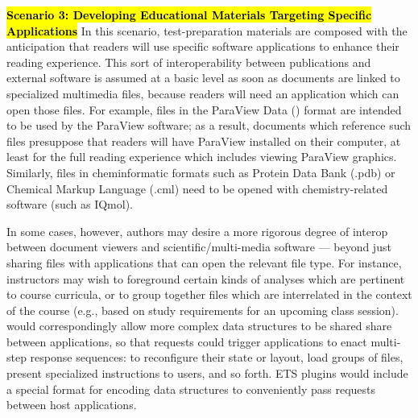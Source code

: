 \documentclass[10pt,letterpaper]{article}
\newcommand{\sectsp}{\vspace{12pt}}
\newcommand{\pseudoIndent}{

\vspace{10pt}\hspace*{12pt}}
\newcommand{\HTXN}{\resizebox{!}{8pt}{\AcronymText{HTXN}}}
\newcommand{\PVD}{\resizebox{!}{8pt}{\AcronymText{PVD}}}
\newcommand{\lEPF}{\resizebox{!}{8.5pt}{\AcronymText{ETS{\color{pfcolor}pf}}}}
\newcommand{\textscc}[1]{{\color{orr!35!black}{{%
						\fontfamily{Cabin-TLF}\fontseries{b}\selectfont{\textsc{\scriptsize{#1}}}}}}}
\newcommand{\AcronymText}[1]{{\textscc{#1}}}
\newcommand{\p}[1]{

\vspace{.85em}#1}
\newcommand{\lun}[1]{\raisebox{-4pt}{\fontfamily{qcr}\selectfont{%
\LARGE{\textbf{\textcolor{tcolor}{#1}}}}}\vspace{-2pt}}
\newenvironment{mldescription}{\vspace{1em}%
  \begin{addmargin}[4pt]{1em}
    \setlength{\parindent}{-1em}%
    \newcommand*{\mlitem}[1][]{\vspace{5pt}\par\medskip%
\hl{ \textbf{##1} }\quad}\indent
}{%
  \end{addmargin}
  \medskip
}
\begin{document}
{{\begin{mldescription}

\vspace{2em}
\mlitem[Scenario 3: Developing Educational 
Materials Targeting Specific Applications]
In this scenario, test-preparation 
materials are composed with the anticipation 
that readers will use specific software applications to 
enhance their reading experience.  This sort 
of interoperability between publications and external 
software is assumed at a basic level 
as soon as documents are linked to specialized 
multimedia files, because readers will need an 
application which can open those files.  For example, files in the 
ParaView Data (\PVD{}) format are intended to be 
used by the ParaView software; as a result, documents 
which reference such files presuppose that readers 
will have ParaView installed on their computer, at least for 
the full reading experience which includes viewing ParaView graphics.  Similarly, files 
in cheminformatic formats such as Protein Data Bank 
(.pdb) or Chemical Markup Language (.cml) need to 
be opened with chemistry-related software (such as  IQmol).

\pseudoIndent{}In some cases, however, authors may 
desire a more rigorous degree of interop between 
document viewers and scientific/multi-media software --- beyond just sharing files 
with applications that can open 
the relevant file type.  For instance, 
instructors may wish to foreground 
certain kinds of analyses which are pertinent to 
course curricula, or to group together files which 
are interrelated in the context of the course 
(e.g., based on study requirements for an upcoming 
class session).  \lEPF{} would correspondingly 
allow more complex data structures to be 
shared share between applications, so 
that requests could trigger applications 
to enact multi-step response sequences: to  reconfigure their state or layout, 
load groups of files, present specialized instructions to users, and so forth.  
ETS plugins would include a special 
format for encoding data structures to 
conveniently pass requests between 
host applications.
\end{mldescription}
}


\end{document}

